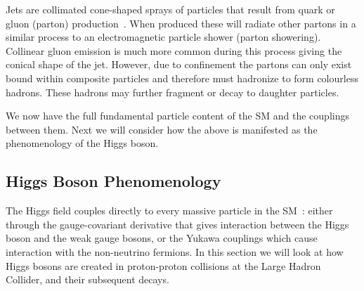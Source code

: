 Jets are collimated cone-shaped sprays of particles that result from quark or gluon (parton) production~\cite{QCD_and_Jets}. 
When produced these will radiate other partons in a similar process to an electromagnetic particle shower (parton showering). 
Collinear gluon emission is much more common during this process giving the conical shape of the jet. 
However, due to confinement the partons can only exist bound within composite particles and therefore must hadronize to form colourless hadrons.
These hadrons may further fragment or decay to daughter particles. 


We now have the full fundamental particle content of the SM and the couplings between them. Next we will consider how the above is manifested as the phenomenology of the Higgs boson.


\subsection{Higgs Boson Phenomenology}
The Higgs field couples directly to every massive particle in the SM~\cite{PDG}: either through the gauge-covariant derivative that gives interaction between the Higgs boson and the weak gauge bosons, or the Yukawa couplings which cause interaction with the non-neutrino fermions. In this section we will look at how Higgs bosons are created in proton-proton collisions at the Large Hadron Collider, and their subsequent decays.

